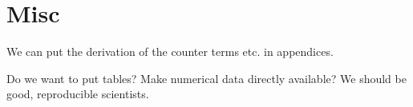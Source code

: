 \documentclass[aps,superscriptaddress,tightenlines,nofootinbib,floatfix,longbibliography,notitlepage]{revtex4-1}
\begin{document}




\appendix
\section{Misc}

We can put the derivation of the counter terms etc. in appendices.

Do we want to put tables?  Make numerical data directly available?  We should be good, reproducible scientists.









\end{document}
